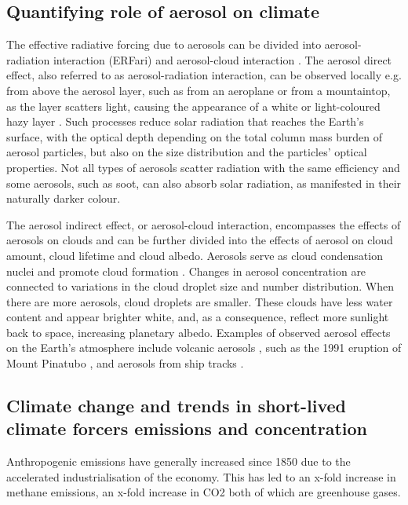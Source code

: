 \subsection{Quantifying role of aerosol on climate}

The effective radiative forcing due to aerosols can be divided into aerosol-radiation interaction (ERFari) and aerosol-cloud interaction \citep[ERFaci;][]{ghanTechnicalNoteEstimating2013}. The aerosol direct effect, also referred to as aerosol-radiation interaction, can be observed locally e.g. from above the aerosol layer, such as from an aeroplane or from a mountaintop, as the layer scatters light, causing the appearance of a white or light-coloured hazy layer \citep{twomeyInfluencePollutionShortwave1977}. Such processes reduce solar radiation that reaches the Earth’s surface, with the optical depth depending on the total column mass burden of aerosol particles, but also on the size distribution and the particles’ optical properties. Not all types of aerosols scatter radiation with the same efficiency and some aerosols, such as soot, can also absorb solar radiation, as manifested in their naturally darker colour. 

The aerosol indirect effect, or aerosol-cloud interaction, encompasses the effects of aerosols on clouds and can be further divided into the effects of aerosol on cloud amount, cloud lifetime and cloud albedo.  Aerosols serve as cloud condensation nuclei and promote cloud formation \citep{albrechtAerosolsCloudMicrophysics1989}.  Changes in aerosol concentration are connected to variations in the cloud droplet size and number distribution. When there are more aerosols, cloud droplets are smaller. These clouds have less water content and appear brighter white, and, as a consequence, reflect more sunlight back to space, increasing planetary albedo. Examples of observed aerosol effects on the Earth’s atmosphere include volcanic aerosols \citep[e.g.][]{malavelleStrongConstraintsAerosol2017}, such as the 1991 eruption of Mount Pinatubo \citep{hansenPotentialClimateImpact1992}, and aerosols from ship tracks \citep{twohyEvaluationAerosolIndirect2005}. 



\subsection{Climate change and trends in short-lived climate forcers emissions and concentration}

Anthropogenic emissions have generally increased since 1850 due to the accelerated industrialisation of the economy. This has led to an x-fold increase in methane emissions, an x-fold increase in CO2 both of which are greenhouse gases. 

